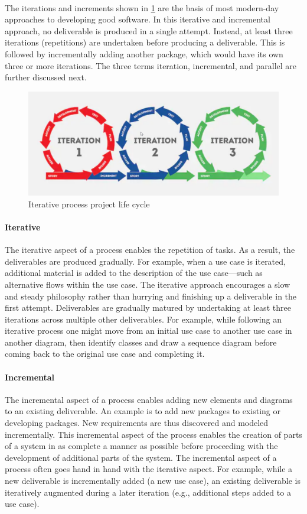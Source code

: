 \paragraph*{}
The iterations and increments shown in \ref{fig:iterationlifecycle} are the basis of most modern-day approaches to developing good software. In this iterative and incremental approach, no deliverable is produced in a single attempt. Instead, at least three iterations (repetitions) are undertaken before producing a deliverable.
This is followed by incrementally adding another package, which would have its own three or more iterations. The three terms iteration, incremental, and parallel are further discussed next.
\begin{figure}[!ht]
      \center
      \includegraphics[scale=0.40]{assets/iteration.png}
      \caption{Iterative process project life cycle}
      \label{fig:iterationlifecycle}
\end{figure}
\paragraph*{Iterative}
The iterative aspect of a process enables the repetition of tasks. As a result, the deliverables are produced gradually. For example, when a use case is iterated, additional material is added to the description of the use case—such as alternative flows within the use case. The iterative approach encourages a slow and steady philosophy rather than hurrying and finishing up a deliverable in the first attempt.
Deliverables are gradually matured by undertaking at least three iterations across multiple other deliverables. For example, while following an iterative process one might move from an initial use case to another use case in another diagram, then identify classes and draw a sequence diagram before coming back to the original use case and completing it.
\paragraph*{Incremental}
The incremental aspect of a process enables adding new elements and diagrams to an existing deliverable. An example is to add new packages to existing or developing packages. New requirements are thus discovered and modeled incrementally. This incremental aspect of the process enables the creation of parts of a system in as complete a manner as possible before proceeding with the development of additional parts of the system. The incremental aspect of a process often goes hand in hand with the iterative aspect. For example, while a new deliverable is incrementally added (a new use case), an existing deliverable is iteratively augmented during a later iteration (e.g., additional steps added to a use case).
\clearpage
